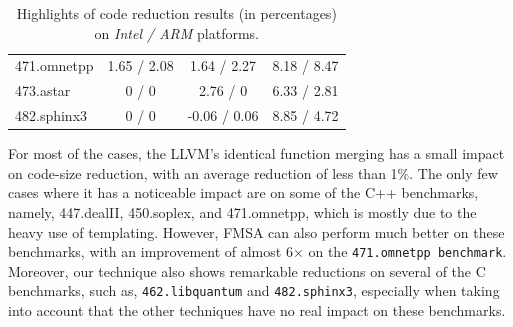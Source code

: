 \begin{table}[]
{\begin{tabular}{lccc}
471.omnetpp                               & 1.65 / 2.08        & 1.64 / 2.27   & 8.18 / 8.47             \\
\rowcolor{evencolor} 473.astar                                 & 0 / 0              & 2.76 / 0      & 6.33 / 2.81             \\
482.sphinx3                               & 0 / 0              & -0.06 / 0.06  & 8.85 / 4.72             \\
\bottomrule
\end{tabular}
}
\caption{Highlights of code reduction results (in percentages) on \textit{Intel / ARM} platforms. }
\end{table}


For most of the cases, the LLVM's identical function merging has a small impact on code-size reduction, with an average reduction of less
than 1\%. The only few cases where it has a noticeable impact are on some of the C++ benchmarks, namely, 447.dealII, 450.soplex, and
471.omnetpp, which is mostly
due to the heavy use of templating. %
However, FMSA can also perform much better on these benchmarks, with an improvement of almost 6$\times$ on the \texttt{471.omnetpp
benchmark}. Moreover, our technique also shows remarkable reductions on several of the C benchmarks, such as, \texttt{462.libquantum} and
\texttt{482.sphinx3}, especially when taking into account that the other techniques have no real impact on these benchmarks.


